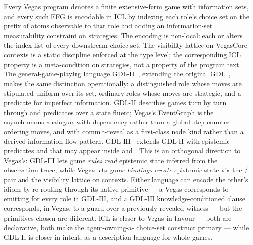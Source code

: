 Every Vegas program denotes a finite extensive-form game with
information sets, and every such EFG is encodable in ICL by
indexing each role's choice set on the prefix of atoms
observable to that role and adding an information-set
measurability constraint on strategies.  The encoding is
non-local: each  or  alters the index list
of every downstream choice set.  The visibility lattice on
VegasCore contexts is a static discipline enforced at the type
level; the corresponding ICL property is a meta-condition on
strategies, not a property of the program text.  The
general-game-playing language
GDL-II~\citep{ThielscherGDLII}, extending the original
GDL~\citep{LovePerkinsEtAl2008GDL}, makes the same distinction
operationally: a distinguished  role whose moves are
stipulated uniform over its  set, ordinary roles whose
moves are strategic, and a  predicate for imperfect
information.  GDL-II describes games turn by turn through
 and  predicates over a state
fluent; Vegas's EventGraph is the asynchronous analogue, with
dependency rather than a global step counter ordering moves, and
with commit-reveal as a first-class node kind rather than a
derived information-flow pattern.  GDL-III~\citep{ThielscherGDLIII}
extends GDL-II with epistemic predicates  and
 that may appear inside  and
.  This is an orthogonal direction to Vegas's:
GDL-III lets game \emph{rules read} epistemic state inferred from
the observation trace, while Vegas lets game \emph{bindings
create} epistemic state via the / pair and
the visibility lattice on contexts.  Either language can encode
the other's idiom by re-routing through its native primitive ---
a Vegas  corresponds to emitting  for every
role in GDL-III, and a GDL-III knowledge-conditioned 
clause corresponds, in Vegas, to a guard over a previously
revealed witness --- but the primitives chosen are different.  ICL is closer to Vegas in
flavour --- both are declarative, both make the agent-owning-a-
choice-set construct primary --- while GDL-II is closer in
intent, as a description language for whole games.

